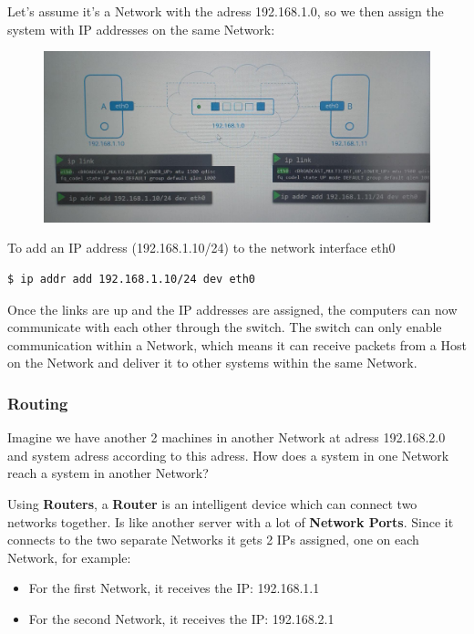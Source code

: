 \documentclass{article}
\newenvironment{codetemplate}[1][]{%
  \mybasecolorbox[#1]
  \itshape
}{%
  \endmybasecolorbox
}
\begin{document}
Let's assume it's a Network with the adress 192.168.1.0, so we then assign the system with IP addresses on the same Network:

\begin{figure}[H]
    \includegraphics[width=\textwidth]{pictures/ntw2.png}
\end{figure}

To add an IP address (192.168.1.10/24) to the network interface eth0
\begin{codetemplate}{}
\begin{verbatim}
$ ip addr add 192.168.1.10/24 dev eth0
\end{verbatim}
\end{codetemplate}

Once the links are up and the IP addresses are assigned, the computers can now communicate with each other through the switch. The switch can only enable communication within a Network, which means it can receive packets from a Host on the Network and deliver it to other systems within the same Network.

\subsubsection{Routing}

Imagine we have another 2 machines in another Network at adress 192.168.2.0 and system adress according to this adress. How does a system in one Network reach a system in another Network?

Using \textbf{Routers}, a \textbf{Router} is an intelligent device which can connect two networks together. Is like another server with a lot of \textbf{Network Ports}. Since it connects to the two separate Networks it gets 2 IPs assigned, one on each Network, for example:

\begin{itemize}
    \item For the first Network, it receives the IP: 192.168.1.1
    \item For the second Network, it receives the IP: 192.168.2.1
\end{itemize}
\end{document}
